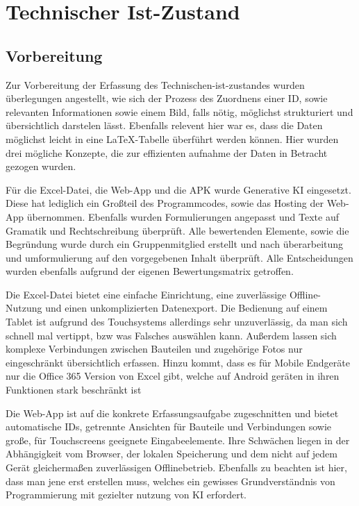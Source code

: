 \chapter{Technischer Ist-Zustand}\label{ch:technischer-ist-zustand}

\section{Vorbereitung}\label{sec:vorbereitung}
Zur Vorbereitung der Erfassung des Technischen-ist-zustandes wurden überlegungen angestellt, wie sich der Prozess des Zuordnens einer ID, sowie relevanten Informationen sowie einem Bild, falls nötig, möglichst strukturiert und übersichtlich darstelen lässt.
Ebenfalls relevent hier war es, dass die Daten möglichst leicht in eine \LaTeX-Tabelle überführt werden können.
Hier wurden drei mögliche Konzepte, die zur effizienten aufnahme der Daten in Betracht gezogen wurden.

Für die Excel-Datei, die Web-App und die APK wurde Generative KI eingesetzt.
Diese hat lediglich ein Großteil des Programmcodes, sowie das Hosting der Web-App übernommen.
Ebenfalls wurden Formulierungen angepasst und Texte auf Gramatik und Rechtschreibung überprüft.
Alle bewertenden Elemente, sowie die Begründung wurde durch ein Gruppenmitglied erstellt und nach überarbeitung und umformulierung auf den vorgegebenen Inhalt überprüft.
Alle Entscheidungen wurden ebenfalls aufgrund der eigenen Bewertungsmatrix getroffen.

Die Excel-Datei bietet eine einfache Einrichtung, eine zuverlässige Offline-Nutzung und einen unkomplizierten Datenexport.
Die Bedienung auf einem Tablet ist aufgrund des Touchsystems allerdings sehr unzuverlässig, da man sich schnell mal vertippt, bzw was Falsches auswählen kann.
Außerdem lassen sich komplexe Verbindungen zwischen Bauteilen und zugehörige Fotos nur eingeschränkt übersichtlich erfassen.
Hinzu kommt, dass es für Mobile Endgeräte nur die Office 365 Version von Excel gibt, welche auf Android geräten in ihren Funktionen stark beschränkt ist

Die Web-App ist auf die konkrete Erfassungsaufgabe zugeschnitten und bietet automatische IDs, getrennte Ansichten für Bauteile und Verbindungen sowie große, für Touchscreens geeignete Eingabeelemente.
Ihre Schwächen liegen in der Abhängigkeit vom Browser, der lokalen Speicherung und dem nicht auf jedem Gerät gleichermaßen zuverlässigen Offlinebetrieb.
Ebenfalls zu beachten ist hier, dass man jene erst erstellen muss, welches ein gewisses Grundverständnis von Programmierung mit gezielter nutzung von KI erfordert.

